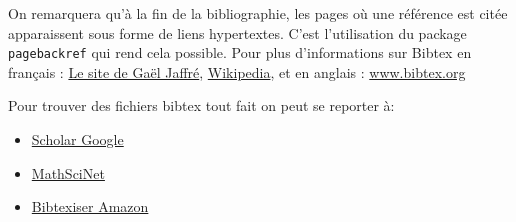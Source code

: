 On remarquera qu'à la fin de la bibliographie, les pages où une référence est citée apparaissent sous
 forme de liens hypertextes. C'est l'utilisation du package \lstinline+pagebackref+ qui rend cela possible.
Pour plus d'informations sur Bibtex en français : 
\href{http://www.irit.fr/~Alain.Crouzil/jaffre/LOGICIELS/LATEX_BIBTEX/bibtex1.html}{Le site de Gaël Jaffré},
\href{http://fr.wikipedia.org/wiki/BibTeX}{Wikipedia},  
et en anglais :  \href{http://www.bibtex.org/}{www.bibtex.org} 

Pour trouver des fichiers bibtex tout fait on peut se reporter \`a:

\begin{itemize}
 \item \href{http://scholar.google.com/}{Scholar Google}
 \item \href{http://ams.u-strasbg.fr/mathscinet/}{MathSciNet}
 \item \href{http://lead.to/amazon/en/}{Bibtexiser Amazon}
\end{itemize}

